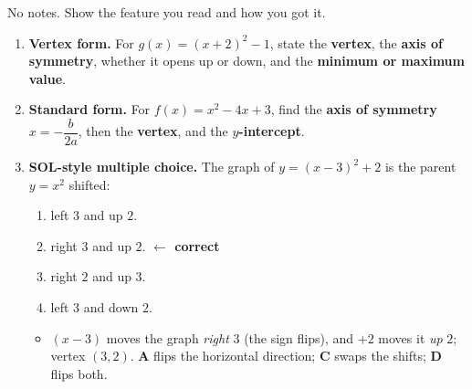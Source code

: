 \documentclass[10pt]{article}
\begin{document}

\vspace{0.12in}

No notes. Show the feature you read and how you got it.

\begin{enumerate}[leftmargin=1.8em, itemsep=12pt]
  \item \textbf{Vertex form.} For $g(x) = (x+2)^2 - 1$, state the \textbf{vertex}, the \textbf{axis of
        symmetry}, whether it opens up or down, and the \textbf{minimum or maximum value}.
  \item \textbf{Standard form.} For $f(x) = x^2 - 4x + 3$, find the \textbf{axis of symmetry}
        $x=-\dfrac{b}{2a}$, then the \textbf{vertex}, and the \textbf{$y$-intercept}.
  \item \textbf{SOL-style multiple choice.} The graph of $y = (x-3)^2 + 2$ is the parent $y=x^2$
        shifted:
        \begin{enumerate}[label=\Alph*., leftmargin=1.9em, itemsep=1pt]
          \item left $3$ and up $2$.
          \item right $3$ and up $2$. \textcolor{keyred}{\textbf{$\leftarrow$ correct}}
          \item right $2$ and up $3$.
          \item left $3$ and down $2$.
        \end{enumerate}
        \begin{itemize}[leftmargin=1.4em, nosep]
          \item[] $(x-3)$ moves the graph \emph{right} $3$ (the sign flips), and $+2$ moves it \emph{up} $2$; vertex $(3,2)$. \textbf{A} flips the horizontal direction; \textbf{C} swaps the shifts; \textbf{D} flips both.
        \end{itemize}
\end{enumerate}
\end{document}
